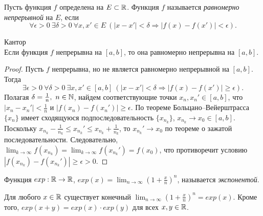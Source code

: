     \begin{definition}
        Пусть функция $f$ определена на $E \subset \mathbb{R}$. Функция $f$ называется \textit{равномерно непрерывной} на $E$, если
        \[\forall \epsilon > 0 \ \exists \delta > 0 \ \forall x, x' \in E \ (|x - x'| < \delta \Rightarrow |f(x) - f(x')| < \epsilon).\]
    \end{definition}

    \begin{theorem}{Кантор}\\
        Если функция $f$ непрерывна на $[a, b]$, то она равномерно непрерывна на $[a, b]$.
    \end{theorem}

    \begin{proof}
        Пусть $f$ непрерывна, но не является равномерно непрерывной на $[a, b]$. Тогда 
        \[\exists \epsilon > 0 \ \forall \delta > 0 \ \exists x, x' \in [a, b] \ (|x - x'| < \delta \Rightarrow |f(x) - f(x')| \geq \epsilon).\]
        Полагая $\delta = \frac{1}{n}, \ n \in \mathbb{N}$, найдем соответствующие точки $x_{n}, x_{n}' \in [a, b]$, что $|x_{n} - x_{n}'| < \frac{1}{n}$ и $|f(x_{n}) - f(x_{n}')| \geq \epsilon$. По теореме Больцано--Вейерштрасса $\{x_{n}\}$ имеет сходящуюся подпоследовательность $\{x_{n_{k}}\}$, $x_{n_{k}} \to x_{0} \in [a, b]$. Поскольку $x_{n_{k}} - \frac{1}{n_{k}} \leq x_{n_{k}}' \leq x_{n_{k}} + \frac{1}{n_{k}}$, то $x_{n_{k}}' \to x_{0}$ по теореме о зажатой последовательности. Следовательно, $\lim_{k \to \infty}f(x_{n_{k}}) = \lim_{k \to \infty}f(x_{n_{k}}') = f(x_{0})$, что противоречит условию $|f(x_{n_{k}}) - f(x_{n_{k}}')| \geq \epsilon > 0$.
    \end{proof}

    \begin{definition}
        Функция $exp: \mathbb{R} \to \mathbb{R}$, $exp(x) = \lim_{n \to \infty}(1 + \frac{x}{n})^{n}$, называется \textit{экспонентой}.
    \end{definition}

    \begin{theorem}
        Для любого $x \in \mathbb{R}$ существует конечный $\lim_{n \to \infty} (1 + \frac{x}{n})^{n} = exp (x)$. Кроме того, $exp(x + y) = exp(x) \cdot exp(y)$ для всех $x, y \in \mathbb{R}$. 
    \end{theorem}
    
